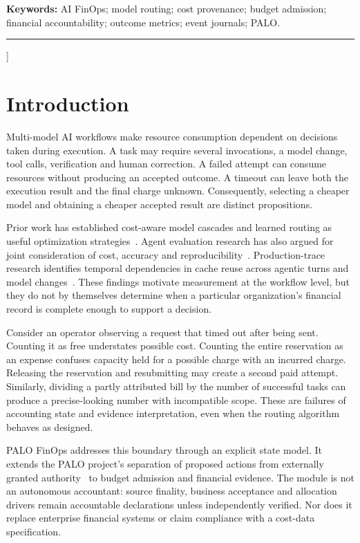 \documentclass[10pt,twocolumn]{article}
\begin{document}
{\begin{@twocolumnfalse}
\begin{abstract}
\end{abstract}
{\small\noindent\textbf{Keywords:} AI FinOps; model routing; cost provenance; budget admission; financial accountability; outcome metrics; event journals; PALO.\par}
\vspace{0.7em}\rule{\textwidth}{0.5pt}\vspace{0.9em}
\end{@twocolumnfalse}
}]

\section{Introduction}

Multi-model AI workflows make resource consumption dependent on decisions taken during execution. A task may require several invocations, a model change, tool calls, verification and human correction. A failed attempt can consume resources without producing an accepted outcome. A timeout can leave both the execution result and the final charge unknown. Consequently, selecting a cheaper model and obtaining a cheaper accepted result are distinct propositions.

Prior work has established cost-aware model cascades and learned routing as useful optimization strategies~\cite{frugalgpt,routellm}. Agent evaluation research has also argued for joint consideration of cost, accuracy and reproducibility~\cite{agentsmatter}. Production-trace research identifies temporal dependencies in cache reuse across agentic turns and model changes~\cite{copilot}. These findings motivate measurement at the workflow level, but they do not by themselves determine when a particular organization's financial record is complete enough to support a decision.

Consider an operator observing a request that timed out after being sent. Counting it as free understates possible cost. Counting the entire reservation as an expense confuses capacity held for a possible charge with an incurred charge. Releasing the reservation and resubmitting may create a second paid attempt. Similarly, dividing a partly attributed bill by the number of successful tasks can produce a precise-looking number with incompatible scope. These are failures of accounting state and evidence interpretation, even when the routing algorithm behaves as designed.

PALO FinOps addresses this boundary through an explicit state model. It extends the PALO project's separation of proposed actions from externally granted authority~\cite{palo} to budget admission and financial evidence. The module is not an autonomous accountant: source finality, business acceptance and allocation drivers remain accountable declarations unless independently verified. Nor does it replace enterprise financial systems or claim compliance with a cost-data specification.
\end{document}
